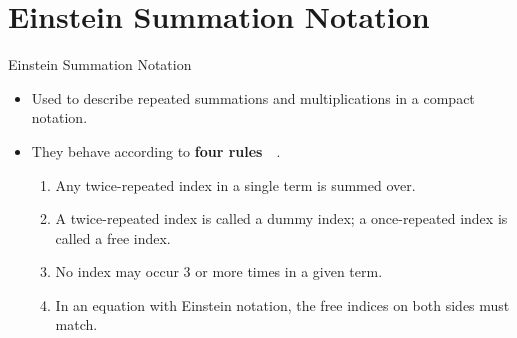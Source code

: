 \documentclass[aspectratio=169,xcolor=dvipsnames]{beamer}
\begin{document}
\section{Einstein Summation Notation}

\begin{frame}{Einstein Summation Notation}
    \begin{itemize}
      \item Used to describe repeated summations and multiplications in a compact notation.
      \item They behave according to \textbf{four rules}~{\color{red}~\cite{Khan2023}}.
            \begin{enumerate}
            \item Any twice-repeated index in a single term is summed over.
            \item A twice-repeated index is called a dummy index; a once-repeated 
                  index is called a free index.
            \item No index may occur 3 or more times in a given term.
            \item In an equation with Einstein notation, the free indices on both sides must
                  match.
            \end{enumerate}
    \end{itemize}
\end{frame}
\end{document}
